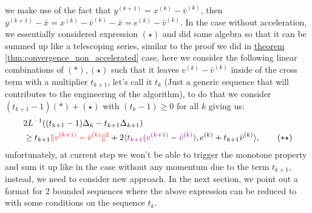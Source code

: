 \documentclass[]{article}
\theoremstyle{definition}
\begin{document}
        we make use of the fact that $y^{(k + 1)} = x^{(k)} - \bar v^{(k)}$, then $y^{(k + 1)} - \bar x = x^{(k)} - \bar v^{(k)} - \bar x = e^{(k)} - \bar v^{(k)}$. In the case without acceleration, we essentially considered expression $(\star)$ and did some algebra so that it can be summed up like a telescoping series, similar to the proof we did in \hyperref[thm:convergence_non_accelerated]{theorem \ref*{thm:convergence_non_accelerated}} case, here we consider the following linear combinations of $(*), (\star)$ such that it leaves $v^{(k)} - \bar v^{(k)}$ inside of the cross term with a multiplier $t_{k + 1}$, let's call it $t_k$ (Just a generic sequence that will contributes to the engineering of the algorithm), to do that we consider $(t_{k + 1}- 1)(*) + (\star)$ with $(t_k - 1)\ge 0$ for all $k$ giving us: 
        \begin{align*}
            & 2L^{-1}((t_{k + 1} - 1)\Delta_k - t_{k + 1}\Delta_{k + 1})
            \\
            & \ge 
            t_{k + 1}
            \textcolor{red}{\Vert v^{(k + 1)} - \bar v^{(k)}\Vert^2} + 
            2\langle 
                \textcolor{violet}{t_{k + 1}(v^{(k + 1)} - \bar v^{(k)})}, e^{(k)} + t_{k + 1} \bar v^{(k)}
            \rangle, 
            \tag{$*\star$}
        \end{align*}
        unfortunately, at current step we won't be able to trigger the monotone property and sum it up like in the case without any momentum due to the term $t_{k + 1}$, instead, we need to consider new approach. In the next section, we point out a format for 2 bounded sequences where the above expression can be reduced to with some conditions on the sequence $t_k$. 
\end{document}
